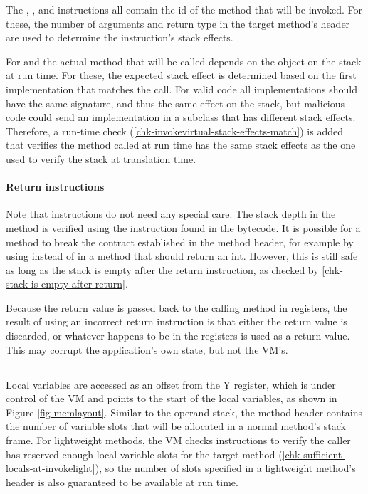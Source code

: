 The , , and  instructions all contain the id of the method that will be invoked. For these, the number of arguments and return type in the target method's header are used to determine the instruction's stack effects.
 
For  and  the actual method that will be called depends on the object on the stack at run time. For these, the expected stack effect is determined based on the first implementation that matches the call. For valid code all implementations should have the same signature, and thus the same effect on the stack, but malicious code could send an implementation in a subclass that has different stack effects. Therefore, a run-time check (\ref{chk-invokevirtual-stack-effects-match}) is added that verifies the method called at run time has the same stack effects as the one used to verify the stack at translation time.

\paragraph{Return instructions}
Note that  instructions do not need any special care. The stack depth in the method is verified using the instruction found in the bytecode. It is possible for a method to break the contract established in the method header, for example by using  instead of  in a method that should return an int. However, this is still safe as long as the stack is empty after the return instruction, as checked by \ref{chk-stack-is-empty-after-return}.

Because the return value is passed back to the calling method in registers, the result of using an incorrect return instruction is that either the return value is discarded, or whatever happens to be in the registers is used as a return value. This may corrupt the application's own state, but not the VM's.

\subsection{}
Local variables are accessed as an offset from the Y register, which is under control of the VM and points to the start of the local variables, as shown in Figure \ref{fig-memlayout}. Similar to the operand stack, the method header contains the number of variable slots that will be allocated in a normal method's stack frame. For lightweight methods, the VM checks  instructions to verify the caller has reserved enough local variable slots for the target method (\ref{chk-sufficient-locals-at-invokelight}), so the number of slots specified in a lightweight method's header is also guaranteed to be available at run time.

